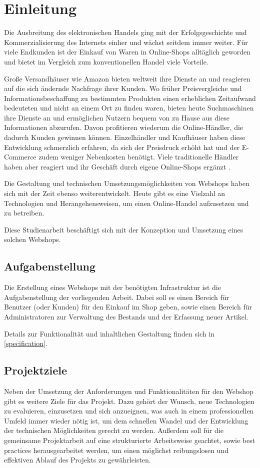 \section{Einleitung} \thispagestyle{nomarkstyle}
Die Ausbreitung des elektronischen Handels ging mit der Erfolgsgeschichte und Kommerzialisierung des Internets einher und wächst seitdem immer weiter.
Für viele Endkunden ist der Einkauf von Waren in Online-Shops alltäglich geworden und bietet im Vergleich zum konventionellen Handel viele Vorteile.

Große Versandhäuser wie Amazon bieten weltweit ihre Dienste an und reagieren auf die sich ändernde Nachfrage ihrer Kunden.
Wo früher Preisvergleiche und Informationsbeschaffung zu bestimmten Produkten einen erheblichen Zeitaufwand bedeuteten und nicht an einem Ort zu finden waren, bieten heute Suchmaschinen ihre Dienste an und ermöglichen Nutzern bequem von zu Hause aus diese Informationen abzurufen.
Davon profitieren wiederum die Online-Händler, die dadurch Kunden gewinnen können.
Einzelhändler und Kaufhäuser haben diese Entwicklung schmerzlich erfahren, da sich der Preisdruck erhöht hat und der E-Commerce zudem weniger Nebenkosten benötigt.
Viele traditionelle Händler haben aber reagiert und ihr Geschäft durch eigene Online-Shops ergänzt \cite{Riehm2004}.

Die Gestaltung und technischen Umsetzungsmöglichkeiten von Webshops haben sich mit der Zeit ebenso weiterentwickelt.
Heute gibt es eine Vielzahl an Technologien und Herangehensweisen, um einen Online-Handel aufzusetzen und zu betreiben.

Diese Studienarbeit beschäftigt sich mit der Konzeption und Umsetzung eines solchen Webshops.

\subsection{Aufgabenstellung}
Die Erstellung eines Webshops mit der benötigten Infrastruktur ist die Aufgabenstellung der vorliegenden Arbeit.
Dabei soll es einen Bereich für Benutzer (oder Kunden) für den Einkauf im Shop geben, sowie einen Bereich für Administratoren zur Verwaltung des Bestands und der Erfassung neuer Artikel.

Details zur Funktionalität und inhaltlichen Gestaltung finden sich in \cref{specification}.
\subsection{Projektziele}
Neben der Umsetzung der Anforderungen und Funktionalitäten für den Webshop gibt es weitere Ziele für das Projekt.
Dazu gehört der Wunsch, neue Technologien zu evaluieren, einzusetzen und sich anzueignen, was auch in einem professionellen Umfeld immer wieder nötig ist, um dem schnellen Wandel und der Entwicklung der technischen Möglichkeiten gerecht zu werden.
Außerdem soll für die gemeinsame Projektarbeit auf eine strukturierte Arbeitsweise geachtet, sowie best practices herausgearbeitet werden, um einen möglichst reibungslosen und effektiven Ablauf des Projekts zu gewährleisten.
